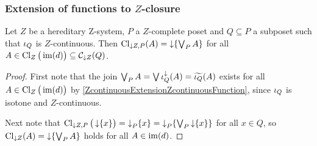\subsubsection{Extension of functions to $Z$-closure}
\begin{lemma} \label{extensionDomainDownsetCompletion}
Let $Z$ be a hereditary $\mathrm{Z}$-system, $P$ a $Z$-complete poset and $Q \subseteq P$ a subposet such that $\operatorname{\iota}_Q$ is $Z$-continuous. Then $\operatorname{Cl}_{\downarrow Z, P}(A) = \operatorname{\downarrow} \{\bigvee_P A\}$ for all $A\in \operatorname{Cl}_Z\big(\operatorname{im}(d)\big) \subseteq \mathcal{C}_{\downarrow Z}(Q)$.
\end{lemma}
\begin{proof}
First note that the join $\bigvee_P A = \bigvee \operatorname{\iota}_Q^\downarrow(A) = \widetilde{\operatorname{\iota}_Q}(A)$ exists for all $A\in \operatorname{Cl}_Z\big(\operatorname{im}(d)\big)$ by \ref{ZcontinuousExtensionZcontinuousFunction}, since $\operatorname{\iota}_Q$ is isotone and $Z$-continuous.

Next note that $\operatorname{Cl}_{\downarrow Z, P}\big(\operatorname{\downarrow} \{x\}\big) = \operatorname{\downarrow}_P \{x\} = \operatorname{\downarrow}_P \{\bigvee_P \operatorname{\downarrow} \{x\}\}$ for all $x\in Q$, so $\operatorname{Cl}_{\downarrow Z}(A) = \operatorname{\downarrow} \{\bigvee_P A\}$ holds for all $A\in \operatorname{im}(d)$.


\end{proof}
